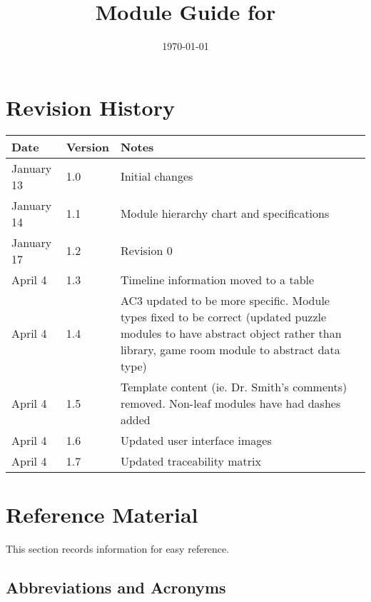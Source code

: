 \documentclass[12pt, titlepage]{article}
\begin{document}
\title{Module Guide for \progname{}} 
\author{\authname}
\date{\today}

\maketitle


\section{Revision History}

\begin{tabularx}{\textwidth}{p{3cm}p{2cm}X}
\toprule {\bf Date} & {\bf Version} & {\bf Notes}\\
\midrule
January 13 & 1.0 & Initial changes \\
January 14 & 1.1 & Module hierarchy chart and specifications\\
January 17 & 1.2 & Revision 0\\
April 4 & 1.3 & Timeline information moved to a table\\
April 4 & 1.4 & AC3 updated to be more specific. Module types fixed to be correct (updated puzzle modules to have abstract object rather than library, game room module to abstract data type)\\
April 4 & 1.5 & Template content (ie. Dr. Smith's comments) removed. Non-leaf modules have had dashes added\\
April 4 & 1.6 & Updated user interface images\\
April 4 & 1.7 & Updated traceability matrix\\
\bottomrule
\end{tabularx}

\newpage

\section{Reference Material}

This section records information for easy reference.

\subsection{Abbreviations and Acronyms}
\end{document}
